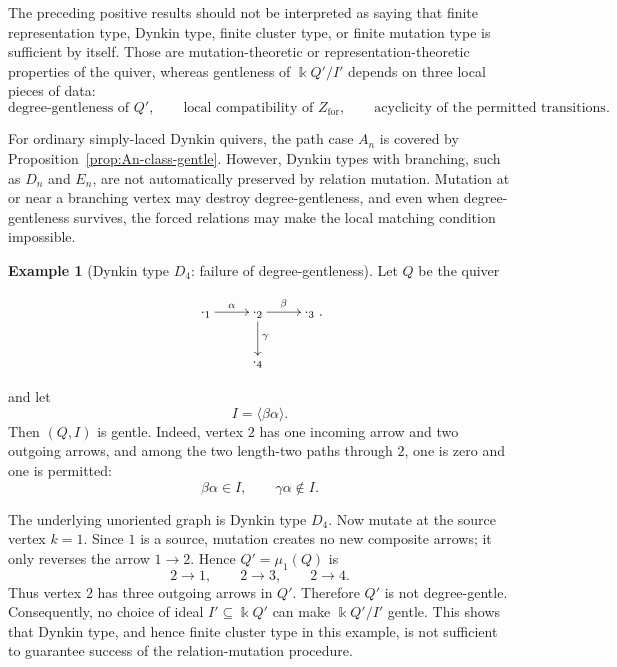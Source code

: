 \documentclass[11pt]{article}
\newcommand{\K}{\Bbbk}
\theoremstyle{plain}
\theoremstyle{definition}
\newtheorem{example}[theorem]{Example}
\theoremstyle{remark}
\begin{document}
The preceding positive results should not be interpreted as saying that finite
representation type, Dynkin type, finite cluster type, or finite mutation type is
sufficient by itself.  Those are mutation-theoretic or representation-theoretic
properties of the quiver, whereas gentleness of \(\K Q'/I'\) depends on three
local pieces of data:
\[
  \text{degree-gentleness of }Q',
  \qquad
  \text{local compatibility of }Z_{\mathrm{for}},
  \qquad
  \text{acyclicity of the permitted transitions.}
\]

For ordinary simply-laced Dynkin quivers, the path case \(A_n\) is covered by
Proposition~\ref{prop:An-class-gentle}.  However, Dynkin types with branching,
such as \(D_n\) and \(E_n\), are not automatically preserved by relation
mutation.  Mutation at or near a branching vertex may destroy degree-gentleness,
and even when degree-gentleness survives, the forced relations may make the
local matching condition impossible.

\begin{example}[Dynkin type \(D_4\): failure of degree-gentleness]
\label{ex:D4-degree-failure}
Let \(Q\) be the quiver

\begin{equation}\label{}
\nonumber   \xymatrix{
\cdot_{1} \ar[r]^{\alpha} & \ar[r]^{\beta}\cdot_{2}\ar[d]^{\gamma} & \cdot_{3}  \\
&\cdot_{4}&}.
  \end{equation}

and let
\[
  I=\langle \beta\alpha\rangle.
\]
Then \((Q,I)\) is gentle.  Indeed, vertex \(2\) has one incoming arrow and two
outgoing arrows, and among the two length-two paths through \(2\), one is zero
and one is permitted:
\[
  \beta\alpha\in I,
  \qquad
  \gamma\alpha\notin I.
\]

The underlying unoriented graph is Dynkin type \(D_4\).  Now mutate at the
source vertex \(k=1\).  Since \(1\) is a source, mutation creates no new
composite arrows; it only reverses the arrow \(1\to 2\).  Hence
\(Q'=\mu_1(Q)\) is
\[
  2\to 1,
  \qquad
  2\to 3,
  \qquad
  2\to 4.
\]
Thus vertex \(2\) has three outgoing arrows in \(Q'\).  Therefore \(Q'\) is not
degree-gentle.  Consequently, no choice of ideal \(I'\subseteq \K Q'\) can make
\(\K Q'/I'\) gentle.  This shows that Dynkin type, and hence finite cluster type
in this example, is not sufficient to guarantee success of the relation-mutation
procedure.
\end{example}
\end{document}
